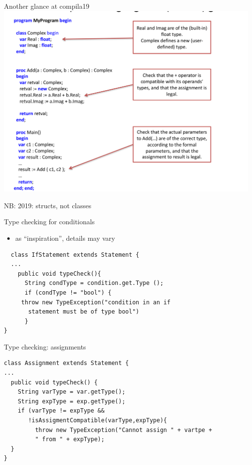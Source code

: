 \documentclass{beamer}
\begin{document}
\begin{frame}[label={sec:orgfae26c2}]{Another glance at compila19}
\includegraphics[width=\textwidth]{figures/snaps/compilaexample-checking}


NB: 2019: structs, not classes 
\end{frame}


\begin{frame}[label={sec:orgfc68c84},fragile,plain]{Type checking for conditionals}
 \begin{itemize}
\item as ``inspiration'', details may vary
\end{itemize}


\lstset{language=java,label= ,caption= ,captionpos=b,numbers=none}
\begin{lstlisting}
  class IfStatement extends Statement {
  ...
    public void typeCheck(){
      String condType = condition.get.Type ();
      if (condType != "bool") {  
	 throw new TypeException("condition in an if 
	   statement must be of type bool")
      }
}
\end{lstlisting}
\end{frame}


\begin{frame}[label={sec:orgc410db0},fragile,plain]{Type checking: assignments}
 \lstset{language=java,label= ,caption= ,captionpos=b,numbers=none}
\begin{lstlisting}
class Assignment extends Statement {
...
  public void typeCheck() {
    String varType = var.getType();
    String expType = exp.getType();
    if (varType != expType &&
       !isAssigmentCompatible(varType,expType){
		 throw new TypeException("Cannot assign " + vartpe + 
		 " from " + expType);
  }
}

\end{lstlisting}
\end{frame}
\end{document}
